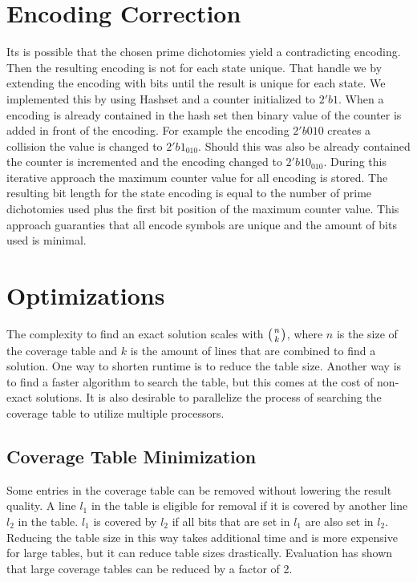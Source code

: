 \section{Encoding Correction}

Its is possible that the chosen prime dichotomies yield a contradicting encoding. Then the resulting encoding is not for each state unique. That handle we by extending the encoding with bits until the result is unique for each state. We implemented this by using Hashset and a counter initialized to $2'b1$. When a encoding is already contained in the hash set then binary value of the counter is added in front of the encoding. For example the encoding $2'b010$ creates a collision the value is changed to $2'b1_010$. Should this was also be already contained the counter is incremented and the encoding changed to $2'b10_010$. During this iterative approach the maximum counter value for all encoding is stored. The resulting bit length for the state encoding is equal to the number of prime dichotomies used plus the first bit position of the maximum counter value. This approach guaranties that all encode symbols are unique and the amount of bits used is minimal.

\section{Optimizations}

The complexity to find an exact solution scales with $\left( n\atop k \right)$, where $n$ is the size of the coverage table and $k$ is the amount of lines that are combined to find a solution. One way to shorten runtime is to reduce the table size. Another way is to find a faster algorithm to search the table, but this comes at the cost of non-exact solutions. It is also desirable to parallelize the process of searching the coverage table to utilize multiple processors.

\subsection{Coverage Table Minimization}

Some entries in the coverage table can be removed without lowering the result quality. A line $l_1$ in the table is eligible for removal if it is covered by another line $l_2$ in the table. $l_1$ is covered by $l_2$ if all bits that are set in $l_1$ are also set in $l_2$. Reducing the table size in this way takes additional time and is more expensive for large tables, but it can reduce table sizes drastically. Evaluation has shown that large coverage tables can be reduced by a factor of 2.

